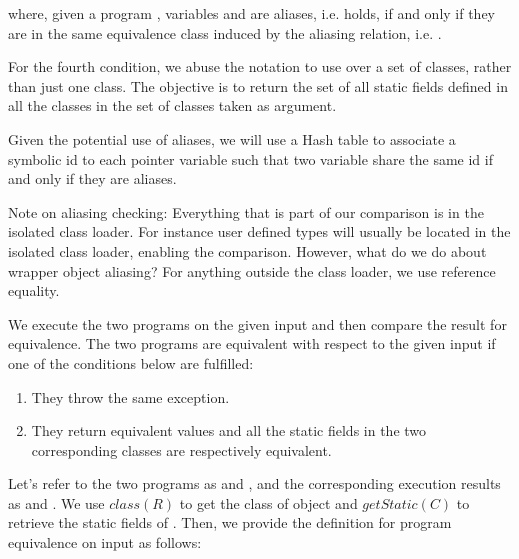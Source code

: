 \documentclass[runningheads,a4paper]{llncs}
\begin{document}
where, given a program , variables  and  are aliases, i.e.  holds,
if and only if they are in the same equivalence class induced by the aliasing relation,
  i.e. .

  For the fourth condition, we abuse the notation to use  over a set of classes, rather than just one class.
  The objective is to return the set of all static fields defined in all the classes in the set of classes taken as argument.
  

Given the potential use of aliases, we will use a Hash table to
associate a symbolic id to each pointer variable such that two
variable share the same id if and only if they are aliases.

Note on aliasing checking:
Everything that is part of our comparison is in the isolated class loader.
For instance user defined types will usually be located in the isolated
class loader, enabling the comparison.
However, what do we do about wrapper object aliasing?
For anything outside the class loader, we use reference equality.

We execute the two programs on the given input and then compare the
result for equivalence. The two programs are equivalent with respect to
the given input if one of the conditions below are fulfilled: 
\begin{enumerate}
\item They throw the same exception.
\item They return equivalent values and all the static fields in the two corresponding classes
  are respectively equivalent.
\end{enumerate}  

Let's refer to the two programs as  and , and the corresponding execution results
as  and . We use $class(R)$ to get the class of object  and
$getStatic(C)$ to retrieve the static fields of . Then, we provide the definition
for program equivalence on input  as follows:
\end{document}
